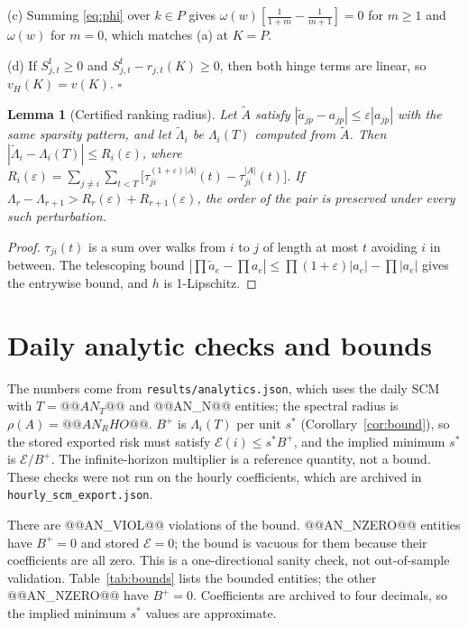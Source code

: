 \documentclass[referee,pdflatex,sn-mathphys-ay]{sn-jnl}
\theoremstyle{thmstyleone}%
\newtheorem{lemma}{Lemma}%
\theoremstyle{thmstyletwo}%
\theoremstyle{thmstylethree}%
\begin{document}
\begin{appendices}
(c) Summing \eqref{eq:phi} over $k\in P$ gives $\omega(w)[\tfrac1{1+m}-\tfrac1{m+1}]=0$ for $m\ge1$ and $\omega(w)$ for $m=0$, which matches (a) at $K=P$.

(d) If $S^{\mathrm f}_{j,t}\ge0$ and $S^{\mathrm f}_{j,t}-r_{j,t}(K)\ge0$, then both hinge terms are linear, so
$v_H(K)=v(K)$. \hfill$\square$

\begin{lemma}[Certified ranking radius]
\label{lem:radius}
Let $\tilde A$ satisfy $|\tilde a_{jp}-a_{jp}|\le\varepsilon|a_{jp}|$ with the same sparsity
pattern, and let $\tilde\Lambda_i$ be $\Lambda_i(T)$ computed from $\tilde A$. Then
$|\tilde\Lambda_i-\Lambda_i(T)|\le R_i(\varepsilon)$, where
$R_i(\varepsilon)=\sum_{j\ne i}\sum_{t<T}\big[\tau^{(1+\varepsilon)|A|}_{ji}(t)-\tau^{|A|}_{ji}(t)\big]$.
If $\Lambda_r-\Lambda_{r+1}>R_r(\varepsilon)+R_{r+1}(\varepsilon)$, the order of the pair is
preserved under every such perturbation.
\end{lemma}
\begin{proof}
$\tau_{ji}(t)$ is a sum over walks from $i$ to $j$ of length at most $t$ avoiding $i$ in between. The telescoping bound $|\prod\tilde a_e-\prod a_e|\le\prod(1+\varepsilon)|a_e|-\prod|a_e|$ gives the entrywise bound, and $h$ is 1-Lipschitz.
\end{proof}

\section{Daily analytic checks and bounds}\label{app:bounds}
\setcounter{table}{0}

The numbers come from \texttt{results/analytics.json}, which uses the daily SCM with $T=@@AN_T@@$ and @@AN_N@@ entities; the
spectral radius is $\rho(A)=@@AN_RHO@@$. $B^+$ is $\Lambda_i(T)$ per unit $s^\ast$ (Corollary~\ref{cor:bound}), so the stored
exported risk must satisfy $\mathcal{E}(i)\le s^\ast B^+$, and the implied minimum $s^\ast$ is $\mathcal{E}/B^+$. The
infinite-horizon multiplier is a reference quantity, not a bound. These checks were not
run on the hourly coefficients, which are archived in \texttt{hourly\_scm\_export.json}.

There are @@AN_VIOL@@ violations of the bound. @@AN_NZERO@@ entities have $B^+=0$ and stored $\mathcal{E}=0$; the bound is vacuous for them
because their coefficients are all zero. This is a one-directional sanity check, not out-of-sample validation. Table~\ref{tab:bounds} lists the bounded entities; the other @@AN_NZERO@@ have $B^+=0$. Coefficients are archived to four decimals, so the implied minimum
$s^\ast$ values are approximate.


\end{appendices}
\end{document}
